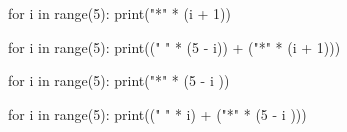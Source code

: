 	for i in range(5):
	    print("*" * (i + 1))
	
	for i in range(5):
	    print((" " * (5 - i)) + ("*" * (i + 1)))
	
	for i in range(5):
	    print("*" * (5 - i ))
	
	for i in range(5):
	    print((" " * i) + ("*" * (5 - i )))	
